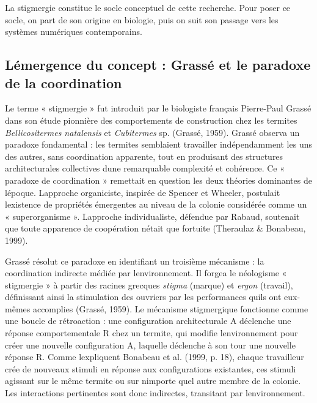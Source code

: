 \documentclass[12pt,a4paper]{article}
\begin{document}
La stigmergie constitue le socle conceptuel de cette recherche. Pour
poser ce socle, on part de son origine en biologie, puis on suit son
passage vers les systèmes numériques contemporains.

\subsection{L\textquotesingle émergence du concept : Grassé et le
paradoxe de la
coordination}\label{luxe9mergence-du-concept--grassuxe9-et-le-paradoxe-de-la-coordination}

Le terme « stigmergie » fut introduit par le biologiste français
Pierre-Paul Grassé dans son étude pionnière des comportements de
construction chez les termites \emph{Bellicositermes natalensis} et
\emph{Cubitermes} sp. (Grassé, 1959). Grassé observa un paradoxe
fondamental : les termites semblaient travailler indépendamment les uns
des autres, sans coordination apparente, tout en produisant des
structures architecturales collectives d\textquotesingle une remarquable
complexité et cohérence. Ce « paradoxe de coordination » remettait en
question les deux théories dominantes de l\textquotesingle époque.
L\textquotesingle approche organiciste, inspirée de Spencer et Wheeler,
postulait l\textquotesingle existence de propriétés émergentes au niveau
de la colonie considérée comme un « superorganisme ».
L\textquotesingle approche individualiste, défendue par Rabaud,
soutenait que toute apparence de coopération n\textquotesingle était que
fortuite (Theraulaz \& Bonabeau, 1999).

Grassé résolut ce paradoxe en identifiant un troisième mécanisme : la
coordination indirecte médiée par l\textquotesingle environnement. Il
forgea le néologisme « stigmergie » à partir des racines grecques
\emph{stigma} (marque) et \emph{ergon} (travail), définissant ainsi la
stimulation des ouvriers par les performances qu\textquotesingle ils ont
eux-mêmes accomplies (Grassé, 1959). Le mécanisme stigmergique
fonctionne comme une boucle de rétroaction : une configuration
architecturale A déclenche une réponse comportementale R chez un
termite, qui modifie l\textquotesingle environnement pour créer une
nouvelle configuration A\textquotesingle, laquelle déclenche à son tour
une nouvelle réponse R\textquotesingle. Comme
l\textquotesingle expliquent Bonabeau et al. (1999, p. 18), chaque
travailleur crée de nouveaux stimuli en réponse aux configurations
existantes, ces stimuli agissant sur le même termite ou sur
n\textquotesingle importe quel autre membre de la colonie. Les
interactions pertinentes sont donc indirectes, transitant par
l\textquotesingle environnement.
\end{document}

